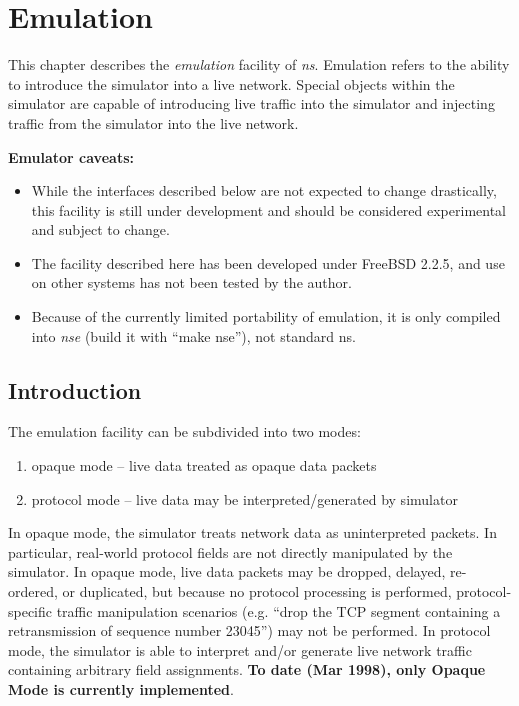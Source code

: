 \chapter{Emulation}
\label{sec:emulation}

This chapter describes the {\em emulation} facility
of \emph{ns}.
Emulation refers to the ability to introduce the
simulator into a live network.
Special objects within the simulator are capable
of introducing live traffic into the simulator and
injecting traffic from the simulator into the
live network.

\textbf{Emulator caveats:}
\begin{itemize}
\item While the interfaces described below
are not expected to change drastically,
this facility is still under development and
should be considered experimental and subject to change.

\item The facility described here has been
developed under FreeBSD 2.2.5, and use on other systems
has not been tested by the author.

\item Because of the currently limited portability of emulation, it
	 is only compiled into \emph{nse}
	(build it with ``make nse''),
	not standard ns.
\end{itemize}

\section{Introduction}

The emulation facility can be subdivided into
two modes:
\begin{enumerate}
\item {\sf opaque mode} -- live data treated as opaque data packets
\item {\sf protocol mode} -- live data may be interpreted/generated by simulator
\end{enumerate}
In opaque mode, the simulator
treats network data as uninterpreted packets.
In particular, real-world protocol fields
are not directly manipulated by the simulator.
In opaque mode, live data packets may be dropped, delayed, re-ordered, or
duplicated, but because no protocol processing is performed,
protocol-specific traffic manipulation scenarios (e.g. ``drop the TCP segment
containing a retransmission of sequence number 23045'') may not be performed.
In protocol mode, the simulator is able to interpret and/or generate
live network traffic containing arbitrary field assignments.
{\bf To date (Mar 1998), only Opaque Mode is currently implemented}.

